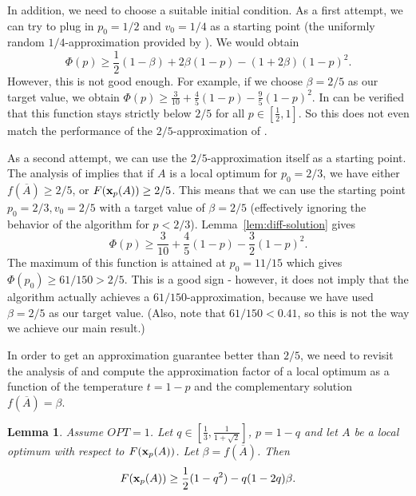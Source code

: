 \documentclass{article}[11pt]
\newtheorem{lemma}[theorem]{Lemma}
\def\bx{{\bf x}}
\begin{document}
In addition, we need to choose a suitable initial condition.
As a first attempt, we can try to plug in $p_0 = 1/2$ and $v_0 = 1/4$ as a starting point
(the uniformly random $1/4$-approximation provided by \cite{FMV07}). We would obtain
$$ \Phi(p) \geq \frac12 (1-\beta) + 2 \beta (1-p) - (1+2\beta) (1-p)^2.$$
However, this is not good enough. For example, if we choose $\beta = 2/5$ as our target value,
we obtain $ \Phi(p) \geq \frac{3}{10} + \frac{4}{5} (1-p) - \frac{9}{5} (1-p)^2.$
In can be verified that this function stays strictly below $2/5$ for all $p \in [\frac12,1]$.
So this does not even match the performance of the $2/5$-approximation of \cite{FMV07}.

As a second attempt, we can use the $2/5$-approximation itself as a starting point.
The analysis of \cite{FMV07} implies that if $A$ is a local optimum for $p_0=2/3$,
we have either $f(\overline{A}) \geq 2/5$, or $F(\bx_p(A)) \geq 2/5$. This means that we can use
the starting point $p_0 = 2/3, v_0 = 2/5$ with a target value of $\beta = 2/5$
(effectively ignoring the behavior of the algorithm for $p < 2/3$).
Lemma~\ref{lem:diff-solution} gives
$$ \Phi(p) \geq \frac{3}{10} + \frac{4}{5} (1-p) - \frac{3}{2} (1-p)^2.$$
The maximum of this function is attained at $p_0 = 11/15$ which gives $\Phi(p_0) \geq 61/150 > 2/5$.
This is a good sign - however, it does not imply that the algorithm actually achieves
a $61/150$-approximation, because we have used $\beta = 2/5$ as our target value.
(Also, note that $61/150 < 0.41$, so this is not the way we achieve our main result.)

In order to get an approximation guarantee better than $2/5$, we need to revisit the analysis of \cite{FMV07}
and compute the approximation factor of a local optimum as a function of the temperature $t=1-p$
and the complementary solution $f(\overline{A}) = \beta$.

\begin{lemma}
\label{lem:starting-point}
Assume $OPT = 1$.
Let $q \in [\frac{1}{3},\frac{1}{1+\sqrt{2}}]$, $p=1-q$ and
let $A$ be a local optimum with respect to $F(\bx_p(A))$.
Let $\beta = f(\overline{A})$. Then 
$$ F(\bx_p(A)) \geq \frac12 (1-q^2) - q(1-2q) \beta.$$
\end{lemma}
\end{document}
